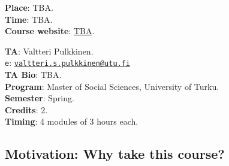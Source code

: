 \documentclass[letterpaper]{article}
\begin{document}
\vspace{5mm}
{\bf Place}: TBA.\\
{\bf Time}: TBA.\\

{\bf Course website}: \href{http://www.hectorbahamonde.com}{TBA}.

\vspace{5mm}
{\bf TA}: Valtteri Pulkkinen.\\
\texttt{e}: \href{mailto:valtteri.s.pulkkinen@utu.fi}{\texttt{valtteri.s.pulkkinen@utu.fi}}\\
{\bf TA Bio}: TBA.\\



\vspace{5mm}
{\bf Program}:  Master of Social Sciences, University of Turku.\\
{\bf Semester}: Spring.\\
{\bf Credits}: 2.\\
{\bf Timing}: 4 modules of 3 hours each. \\





\subsection*{Motivation: Why take this course?}
\end{document}

